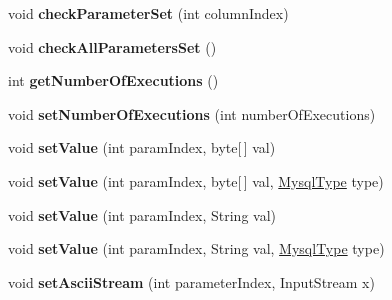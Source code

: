 \begin{DoxyCompactItemize}
void {\bfseries check\+Parameter\+Set} (int column\+Index)
\item 
\mbox{\label{interfacecom_1_1mysql_1_1cj_1_1_query_bindings_a2c3998f19786a54dec34368742733a61}} 
void {\bfseries check\+All\+Parameters\+Set} ()
\item 
\mbox{\label{interfacecom_1_1mysql_1_1cj_1_1_query_bindings_ab38a3623bb4f63d453218f47a2b8399e}} 
int {\bfseries get\+Number\+Of\+Executions} ()
\item 
\mbox{\label{interfacecom_1_1mysql_1_1cj_1_1_query_bindings_a2a30b6f50c4c33fcfef0500197a28bb8}} 
void {\bfseries set\+Number\+Of\+Executions} (int number\+Of\+Executions)
\item 
\mbox{\label{interfacecom_1_1mysql_1_1cj_1_1_query_bindings_a514f5b8e5302409619be7ce0750b2c64}} 
void {\bfseries set\+Value} (int param\+Index, byte\mbox{[}$\,$\mbox{]} val)
\item 
\mbox{\label{interfacecom_1_1mysql_1_1cj_1_1_query_bindings_a6faaa9fdb3d5ef5e04f6bacef9ab7fa3}} 
void {\bfseries set\+Value} (int param\+Index, byte\mbox{[}$\,$\mbox{]} val, \mbox{\hyperlink{enumcom_1_1mysql_1_1cj_1_1_mysql_type}{Mysql\+Type}} type)
\item 
\mbox{\label{interfacecom_1_1mysql_1_1cj_1_1_query_bindings_a93f1da1730b58d69e972b299539ae66c}} 
void {\bfseries set\+Value} (int param\+Index, String val)
\item 
\mbox{\label{interfacecom_1_1mysql_1_1cj_1_1_query_bindings_ae4de974420b8a30d10203dcd8e7bb5a7}} 
void {\bfseries set\+Value} (int param\+Index, String val, \mbox{\hyperlink{enumcom_1_1mysql_1_1cj_1_1_mysql_type}{Mysql\+Type}} type)
\item 
\mbox{\label{interfacecom_1_1mysql_1_1cj_1_1_query_bindings_a2ab9574b9dd0d2b15039d0516cc45ba1}} 
void {\bfseries set\+Ascii\+Stream} (int parameter\+Index, Input\+Stream x)

\end{DoxyCompactItemize}
